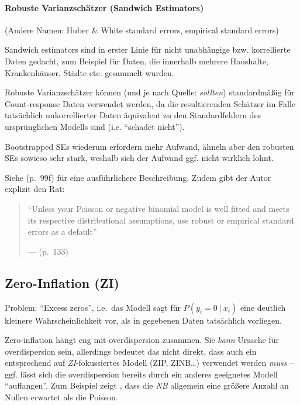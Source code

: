 \documentclass[ngerman,a4paper,]{scrartcl}
\let\oldparagraph\paragraph
\renewcommand{\paragraph}[1]{\oldparagraph{#1}\mbox{}}
\theoremstyle{definition}
\theoremstyle{definition}
\theoremstyle{definition}
\theoremstyle{remark}
\begin{document}
\hypertarget{sandwich}{%
\paragraph{Robuste Varianzschätzer (Sandwich Estimators)}\label{sandwich}}

(Andere Namen: Huber \& White standard errors, empirical standard errors)

Sandwich estimators sind in erster Linie für nicht unabhängige bzw. korrellierte Daten gedacht, zum Beispiel für Daten, die innerhalb mehrere Haushalte, Krankenhäuser, Städte etc. gesammelt wurden.

Robuste Varianzschätzer können (und je nach Quelle: \emph{sollten}) standardmäßig für Count-response Daten verwendet werden, da die resultierenden Schätzer im Falle tatsächlich unkorrellierter Daten äquivalent zu den Standardfehlern des ursprünglichen Modells sind (i.e. \enquote{schadet nicht}).

Bootstrapped SEs wiederum erfordern mehr Aufwand, ähneln aber den robusten SEs sowieso sehr stark, weshalb sich der Aufwand ggf. nicht wirklich lohnt.

Siehe \citet{hilbeModelingCountData2014} (p.~99f) für eine ausführlichere Beschreibung. Zudem gibt der Autor explizit den Rat:

\begin{quote}
\enquote{Unless your Poisson or negative binomial model is well fitted and meets its respective distributional assumptions, use robust or empirical standard errors as a default}

--- \citet{hilbeModelingCountData2014} (p.~133)
\end{quote}

\hypertarget{zeros}{%
\subsection{Zero-Inflation (ZI)}\label{zeros}}

Problem: \enquote{Excess zeros}, i.e.~das Modell sagt für \(P(y_i = 0\ |\ x_i)\) eine deutlich kleinere Wahrscheinlichkeit vor, als in gegebenen Daten tatsächlich vorliegen.

Zero-inflation hängt eng mit overdispersion zusammen. Sie \emph{kann} Ursache für overdispersion sein, allerdings bedeutet das nicht direkt, dass auch ein entsprechend auf \emph{ZI}-fokussiertes Modell (ZIP, ZINB\ldots{}) verwendet werden \emph{muss} -- ggf. lässt sich die overdispersion bereits durch ein anderes geeignetes Modell \enquote{auffangen}. Zum Beispiel zeigt \citet{winkelmannEconometricAnalysisCount2010}, dass die \emph{NB} allgemein eine größere Anzahl an Nullen erwartet als die Poisson.
\end{document}
